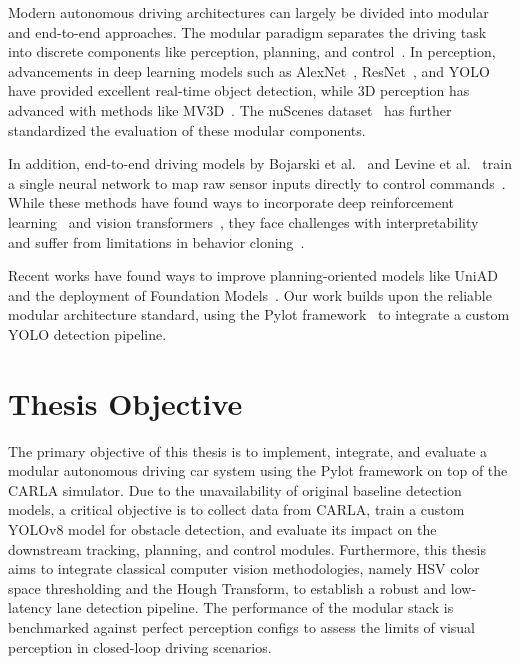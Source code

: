 \documentclass[11pt,a4paper]{report}
\begin{document}
Modern autonomous driving architectures can largely be divided into modular and end-to-end approaches. The modular paradigm separates the driving task into discrete components like perception, planning, and control~\cite{wang2023}. In perception, advancements in deep learning models such as AlexNet~\cite{alexnet2012}, ResNet~\cite{resnet2016}, and YOLO~\cite{yolo2016} have provided excellent real-time object detection, while 3D perception has advanced with methods like MV3D~\cite{mv3d2017}. The nuScenes dataset~\cite{nuscenes2020} has further standardized the evaluation of these modular components.

In addition, end-to-end driving models by Bojarski et al.~\cite{bojarski2016} and Levine et al.~\cite{levine2016} train a single neural network to map raw sensor inputs directly to control commands~\cite{xu2017}. While these methods have found ways to incorporate deep reinforcement learning~\cite{aradi2020} and vision transformers~\cite{swin2021}, they face challenges with interpretability~\cite{bojarski2019} and suffer from limitations in behavior cloning~\cite{codevilla2019}.

Recent works have found ways to improve planning-oriented models like UniAD~\cite{uniad2023} and the deployment of Foundation Models~\cite{wu2025}. Our work builds upon the reliable modular architecture standard, using the Pylot framework~\cite{erdos_pylot} to integrate a custom YOLO detection pipeline.

\section{Thesis Objective} 
\label{sec: obj}
The primary objective of this thesis is to implement, integrate, and evaluate a modular autonomous driving car system using the Pylot framework on top of the CARLA simulator. Due to the unavailability of original baseline detection models, a critical objective is to collect data from CARLA, train a custom YOLOv8 model for obstacle detection, and evaluate its impact on the downstream tracking, planning, and control modules. Furthermore, this thesis aims to integrate classical computer vision methodologies, namely HSV color space thresholding and the Hough Transform, to establish a robust and low-latency lane detection pipeline. The performance of the modular stack is benchmarked against perfect perception configs to assess the limits of visual perception in closed-loop driving scenarios.
\end{document}
